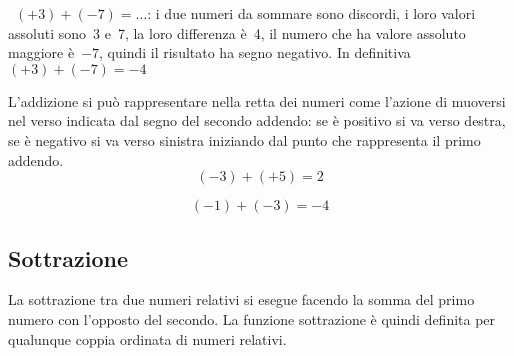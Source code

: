  \begin{esempio}
~\((+3)+(-7)=\ldots\): i due numeri da sommare sono discordi, i loro valori 
assoluti sono~3 e~7, la loro differenza è~4,
il numero che ha valore assoluto maggiore è~\(-7\), quindi il risultato ha 
segno 
negativo.
In definitiva~\((+3)+(-7)=-4\)
 \end{esempio}

L'addizione si può rappresentare nella retta dei numeri come l'azione di 
muoversi nel verso indicata dal segno del
secondo addendo: se è positivo si va verso destra, se è negativo si va 
verso 
sinistra iniziando dal punto che
rappresenta il primo addendo.
 \[(-3)+(+5)=2\]
\begin{center}
 
\end{center}
\[ (-1)+(-3) = -4\]
\begin{center}
 
\end{center}

\subsection{Sottrazione}

La sottrazione tra due numeri relativi si esegue facendo la somma del primo 
numero con l'opposto del secondo.
La funzione sottrazione è quindi definita per qualunque coppia ordinata di 
numeri relativi.


